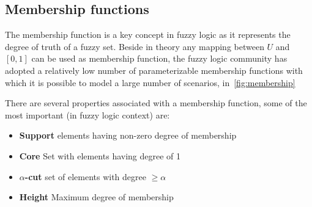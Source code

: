 \documentclass[]{article}
\begin{document}
\subsection{Membership functions}
The membership function is a key concept in fuzzy logic as it represents the
degree of truth of a fuzzy set. Beside in theory any mapping between $U$ and
$[0, 1]$ can be used as membership function, the fuzzy logic community has
adopted a relatively low number of parameterizable membership functions with
which it is possible to model a large number of scenarios, in~\ref{fig:membership}


There are several properties associated with a membership function, some of the most important
(in fuzzy logic context) are:
\begin{itemize}
  \item{\textbf{Support} elements having non-zero degree of membership}
  \item{\textbf{Core} Set with elements having degree of 1}
  \item{\textbf{$\alpha$-cut} set of elements with degree $\geq\alpha$}
  \item{\textbf{Height} Maximum degree of membership}
\end{itemize}
\end{document}
